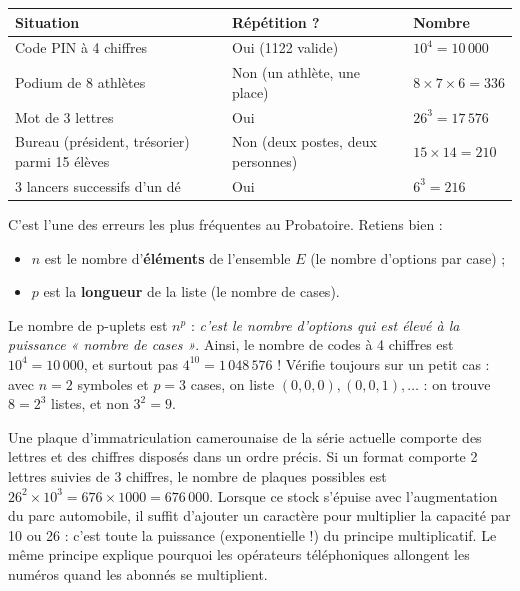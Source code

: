 \documentclass[11pt]{article}
\begin{document}
\begin{center}
\begin{tabularx}{\linewidth}{|l|X|X|}
\hline
\rowcolor{popblueL} \textbf{Situation} & \textbf{Répétition ?} & \textbf{Nombre} \\
\hline
Code PIN à 4 chiffres & Oui (1122 valide) & $10^4 = 10\,000$ \\
\hline
Podium de 8 athlètes & Non (un athlète, une place) & $8 \times 7 \times 6 = 336$ \\
\hline
Mot de 3 lettres & Oui & $26^3 = 17\,576$ \\
\hline
Bureau (président, trésorier) parmi 15 élèves & Non (deux postes, deux personnes) & $15 \times 14 = 210$ \\
\hline
3 lancers successifs d'un dé & Oui & $6^3 = 216$ \\
\hline
\end{tabularx}
\end{center}

\begin{attention}
C'est l'une des erreurs les plus fréquentes au Probatoire. Retiens bien :
\begin{itemize}
\item $n$ est le nombre d'\textbf{éléments} de l'ensemble $E$ (le nombre d'options par case) ;
\item $p$ est la \textbf{longueur} de la liste (le nombre de cases).
\end{itemize}
Le nombre de p-uplets est $n^p$ : \emph{c'est le nombre d'options qui est élevé à la puissance « nombre de cases »}. Ainsi, le nombre de codes à 4 chiffres est $10^4 = 10\,000$, et surtout pas $4^{10} = 1\,048\,576$ ! Vérifie toujours sur un petit cas : avec $n = 2$ symboles et $p = 3$ cases, on liste $(0,0,0), (0,0,1), \ldots$ : on trouve $8 = 2^3$ listes, et non $3^2 = 9$.
\end{attention}

\begin{savaistu}
Une plaque d'immatriculation camerounaise de la série actuelle comporte des lettres et des chiffres disposés dans un ordre précis. Si un format comporte 2 lettres suivies de 3 chiffres, le nombre de plaques possibles est $26^2 \times 10^3 = 676 \times 1000 = 676\,000$. Lorsque ce stock s'épuise avec l'augmentation du parc automobile, il suffit d'ajouter un caractère pour multiplier la capacité par 10 ou 26 : c'est toute la puissance (exponentielle !) du principe multiplicatif. Le même principe explique pourquoi les opérateurs téléphoniques allongent les numéros quand les abonnés se multiplient.
\end{savaistu}
\end{document}
